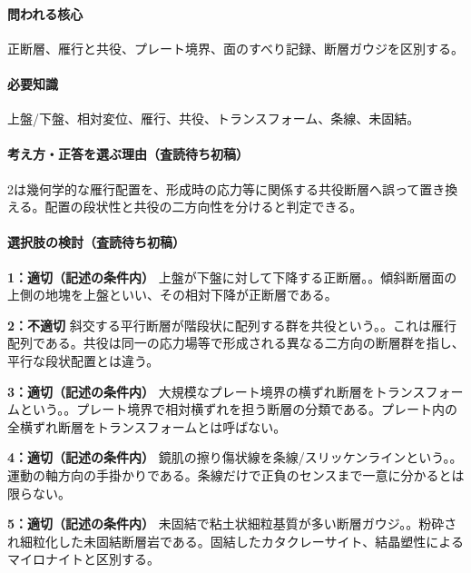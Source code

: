 \paragraph{問われる核心} 正断層、雁行と共役、プレート境界、面のすべり記録、断層ガウジを区別する。

\paragraph{必要知識} 上盤/下盤、相対変位、雁行、共役、トランスフォーム、条線、未固結。

\paragraph{考え方・正答を選ぶ理由（査読待ち初稿）} 2は幾何学的な雁行配置を、形成時の応力等に関係する共役断層へ誤って置き換える。配置の段状性と共役の二方向性を分けると判定できる。

\paragraph{選択肢の検討（査読待ち初稿）}\mbox{}\par

\noindent\textbf{1：適切（記述の条件内）} 上盤が下盤に対して下降する正断層。。傾斜断層面の上側の地塊を上盤といい、その相対下降が正断層である。\par

\noindent\textbf{2：不適切} 斜交する平行断層が階段状に配列する群を共役という。。これは雁行配列である。共役は同一の応力場等で形成される異なる二方向の断層群を指し、平行な段状配置とは違う。\par

\noindent\textbf{3：適切（記述の条件内）} 大規模なプレート境界の横ずれ断層をトランスフォームという。。プレート境界で相対横ずれを担う断層の分類である。プレート内の全横ずれ断層をトランスフォームとは呼ばない。\par

\noindent\textbf{4：適切（記述の条件内）} 鏡肌の擦り傷状線を条線/スリッケンラインという。。運動の軸方向の手掛かりである。条線だけで正負のセンスまで一意に分かるとは限らない。\par

\noindent\textbf{5：適切（記述の条件内）} 未固結で粘土状細粒基質が多い断層ガウジ。。粉砕され細粒化した未固結断層岩である。固結したカタクレーサイト、結晶塑性によるマイロナイトと区別する。\par

